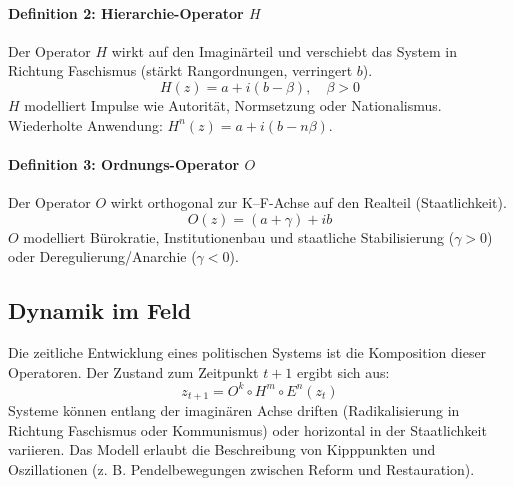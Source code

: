 \documentclass[12pt, a4paper]{article}
\begin{document}
\paragraph{Definition 2: Hierarchie-Operator \(H\)}
Der Operator \(H\) wirkt auf den Imaginärteil und verschiebt das System in Richtung Faschismus (stärkt Rangordnungen, verringert \(b\)).
\[
H(z) = a + i(b - \beta), \quad \beta > 0
\]
\(H\) modelliert Impulse wie Autorität, Normsetzung oder Nationalismus. Wiederholte Anwendung: \(H^n(z) = a + i(b - n\beta)\).

\paragraph{Definition 3: Ordnungs-Operator \(O\)}
Der Operator \(O\) wirkt orthogonal zur K--F-Achse auf den Realteil (Staatlichkeit).
\[
O(z) = (a + \gamma) + ib
\]
\(O\) modelliert Bürokratie, Institutionenbau und staatliche Stabilisierung (\(\gamma > 0\)) oder Deregulierung/Anarchie (\(\gamma < 0\)).

\subsection{Dynamik im Feld}

Die zeitliche Entwicklung eines politischen Systems ist die Komposition dieser Operatoren. Der Zustand zum Zeitpunkt \(t+1\) ergibt sich aus:
\[
z_{t+1} = O^k \circ H^m \circ E^n (z_t)
\]
Systeme können entlang der imaginären Achse driften (Radikalisierung in Richtung Faschismus oder Kommunismus) oder horizontal in der Staatlichkeit variieren. Das Modell erlaubt die Beschreibung von Kipppunkten und Oszillationen (z. B. Pendelbewegungen zwischen Reform und Restauration).
\end{document}
